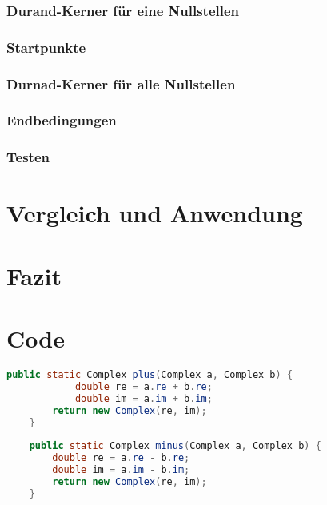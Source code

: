 \documentclass[12pt]{article}
\begin{document}
\subsubsection{Durand-Kerner für eine Nullstellen}
\subsubsection{Startpunkte}
\subsubsection{Durnad-Kerner für alle Nullstellen}
\subsubsection{Endbedingungen}
\subsubsection{Testen}

\section{Vergleich und Anwendung}

\section{Fazit}

\section{Code}

\begin{lstlisting}[language=Java, title={Complex.java: Z. 19-29}]
    public static Complex plus(Complex a, Complex b) {
            double re = a.re + b.re;
            double im = a.im + b.im;
        return new Complex(re, im);
    }
    
    public static Complex minus(Complex a, Complex b) {
        double re = a.re - b.re;
        double im = a.im - b.im;
        return new Complex(re, im);
    }
    \end{lstlisting}
    
\end{document}

